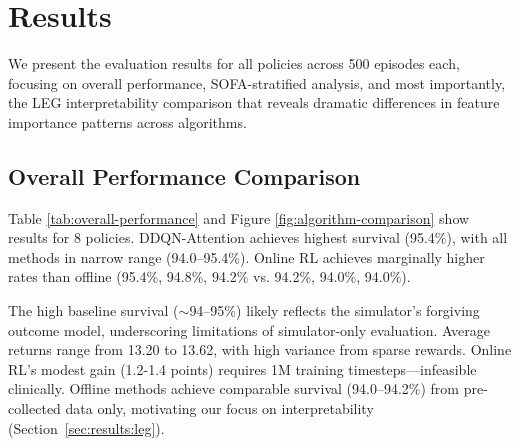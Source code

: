 
\section{Results}\label{sec:results}

We present the evaluation results for all policies across 500 episodes each, focusing on overall performance, SOFA-stratified analysis, and most importantly, the LEG interpretability comparison that reveals dramatic differences in feature importance patterns across algorithms.

\subsection{Overall Performance Comparison}\label{sec:results:overall}

Table \ref{tab:overall-performance} and Figure \ref{fig:algorithm-comparison} show results for 8 policies. DDQN-Attention achieves highest survival (95.4\%), with all methods in narrow range (94.0--95.4\%). Online RL achieves marginally higher rates than offline (95.4\%, 94.8\%, 94.2\% vs. 94.2\%, 94.0\%, 94.0\%).

The high baseline survival ($\sim$94--95\%) likely reflects the simulator's forgiving outcome model, underscoring limitations of simulator-only evaluation. Average returns range from 13.20 to 13.62, with high variance from sparse rewards. Online RL's modest gain (1.2-1.4 points) requires 1M training timesteps—infeasible clinically. Offline methods achieve comparable survival (94.0--94.2\%) from pre-collected data only, motivating our focus on interpretability (Section~\ref{sec:results:leg}).

